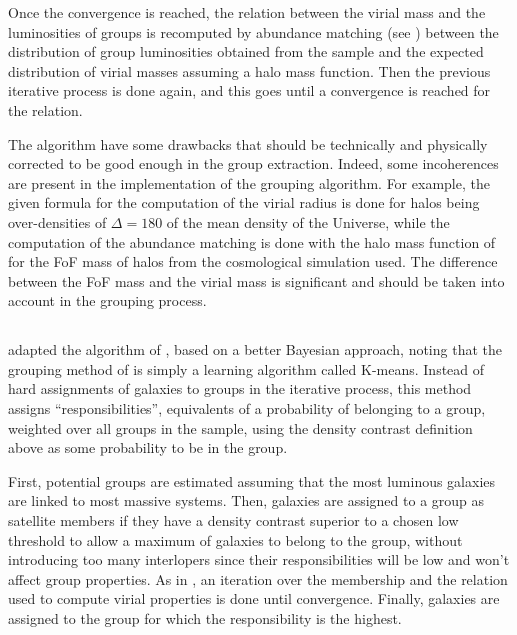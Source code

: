 Once the convergence is reached, the relation between the virial mass and the
luminosities of groups is recomputed by abundance matching (see
) between the distribution of group luminosities
obtained from the sample and the expected distribution of virial masses
assuming a halo mass function. Then the previous iterative process is done
again, and this goes until a convergence is reached for the relation.

The algorithm have some drawbacks that should be technically and physically
corrected to be good enough in the group extraction. Indeed, some incoherences
are present in the implementation of the grouping algorithm. For example, the
given formula for the computation of the virial radius is done for halos being
over-densities of $\Delta=180$ of the mean density of the Universe, while the
computation of the abundance matching is done with the halo mass function of
\citet{Warren+06} for the FoF mass of halos from the cosmological simulation
used. The difference between the FoF mass and the virial mass is significant
and should be taken into account in the grouping process.

\subsection{\citet{DominguezRomero+12}}
\label{sub:dominguezromero12}

\cite{DominguezRomero+12} adapted the algorithm of \citet{Yang+07}, based on a
better Bayesian approach, noting that the grouping method of \citet{Yang+07} is
simply a learning algorithm called K-means. Instead of hard assignments of
galaxies to groups in the iterative process, this method assigns
``responsibilities'', equivalents of a probability of belonging to a group,
weighted over all groups in the sample, using the density contrast definition
above as some probability to be in the group.

First, potential groups are estimated assuming that the most luminous galaxies
are linked to most massive systems. Then, galaxies are assigned to a group as
satellite members if they have a density contrast superior to a chosen low
threshold to allow a maximum of galaxies to belong to the group, without
introducing too many interlopers since their responsibilities will be low and
won't affect group properties. As in \citet{Yang+07}, an iteration over the
membership and the relation used to compute virial properties is done until
convergence. Finally, galaxies are assigned to the group for which the
responsibility is the highest.


